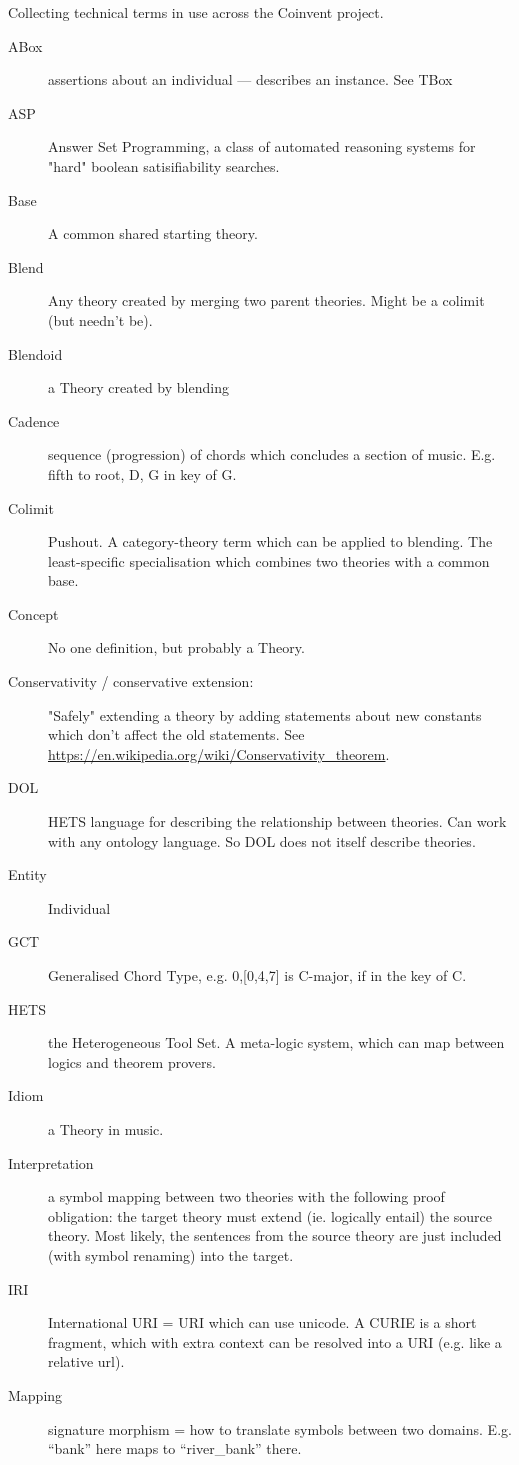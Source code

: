 \documentclass[10pt]{article}
\begin{document}
\begin{appendices}
	
Collecting technical terms in use across the Coinvent project.
\begin{description}
 \item[ABox]{assertions about an individual — describes an instance. See TBox}
 \item[ASP]{Answer Set Programming, a class of automated reasoning systems for "hard"
 boolean satisifiability searches.}
 \item[Base]{A common shared starting theory.}
 \item[Blend]{Any theory created by merging two parent theories. Might be a colimit (but needn't be).}
 \item[Blendoid]{a Theory created by blending}
 \item[Cadence]{sequence (progression) of chords which concludes a section of music. E.g. fifth to root, D, G in key of G.}
 \item[Colimit]{Pushout. A category-theory term which can be applied to blending. The least-specific specialisation which combines two theories with a common base.}
 \item[Concept]{No one definition, but probably a Theory.}
 \item[Conservativity / conservative extension:] {"Safely" extending a theory by adding statements about new constants which don’t affect the old statements. See \url{https://en.wikipedia.org/wiki/Conservativity_theorem}.}
 \item[DOL]{HETS language for describing the relationship between theories. Can work with any ontology language. So DOL does not itself describe theories.}
 \item[Entity]{Individual}
 \item[GCT]{Generalised Chord Type, e.g. 0,[0,4,7] is C-major, if in the key of C.}
 \item[HETS]{the Heterogeneous Tool Set. A meta-logic system, which can map between logics and theorem provers.}
 \item[Idiom]{a Theory in music.}
 \item[Interpretation]{a symbol mapping between two theories with the following proof obligation: the target theory must extend (ie. logically entail) the source theory. Most likely, the sentences from the source theory are just included (with symbol renaming) into the target.}
 \item[IRI]{International URI = URI which can use unicode. A CURIE is a short fragment, which with extra context can be resolved into a URI (e.g. like a relative url).}
 \item[Mapping]{signature morphism = how to translate symbols between two domains. E.g. “bank” here maps to “river\_bank” there.}

\end{description}
\end{appendices}
\end{document}
